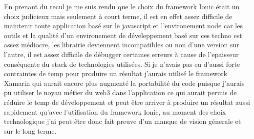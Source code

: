 En prenant du recul je me suis rendu que le choix du framework Ionic était un choix judicieux 
mais seulement à court terme, il est en effet assez difficile de maintenir toute 
application basé sur le javascript et l'environement node car les outils et la qualité 
d'un environement de déveleppement basé sur ces techno est assez médiocre, les librairie 
deviennent incompatibles ou non d'une version sur l'autre, il est assez difficile 
de débugger certaines erreurs à cause de l'epaisseur conséquente du stack de technologies
utilisées. Si je n'avais pas eu d'aussi forte contraintes de temp pour produire un résultat 
j'aurais utilisé le framework Xamarin qui aurait encore plus augmenté la portabilité 
du code puisque j'aurais pu utiliser le noyau métier du web3 dans l'application
ce qui aurait permis de réduire le temp de développement et peut être arriver 
à produire un résultat aussi rapidement qu'avec l'utilisation du framework Ionic, 
au moment des choix technologique j'ai peut être donc fait preuve d'un manque de vision génerale
et sur le long terme. \newline


